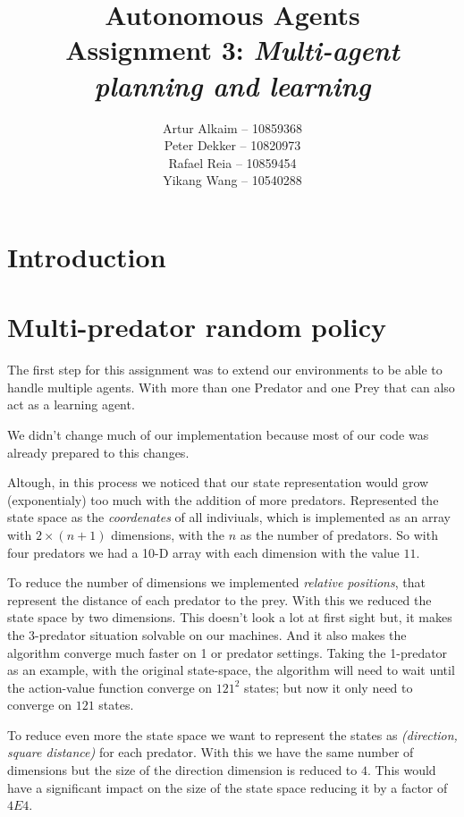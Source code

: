 \documentclass{article}
\begin{document}
\title{Autonomous Agents\\
Assignment 3: \emph{Multi-agent planning and learning}}
\author{
Artur Alkaim -- 10859368\\
Peter Dekker -- 10820973\\
Rafael Reia -- 10859454\\
Yikang Wang -- 10540288\\
}
\maketitle
\section{Introduction}

\section{Multi-predator random policy}
The first step for this assignment was to extend our environments to be able to
handle multiple agents. With more than one Predator and one Prey that can also
act as a learning agent.

We didn't change much of our implementation because most of our code was
already prepared to this changes.

Altough, in this process we noticed that our state representation would grow
(exponentialy) too much with the addition of more predators. Represented the
state space as the \emph{coordenates} of all indiviuals, which is implemented as
an array with $2 \times (n+1)$ dimensions, with the $n$ as the number of predators. So with four predators we had a 10-D array with each dimension with the value $11$. 

To reduce the number of dimensions we implemented \emph{relative positions},
that represent the distance of each predator to the prey. With this we reduced the
state space by two dimensions. This doesn't look a lot at first sight but, it makes the 3-predator situation solvable on our machines. And it also makes the algorithm converge much faster on 1 or predator settings. Taking the 1-predator as an example, with the original state-space, the algorithm will need to wait until the action-value function converge on $121^2$ states; but now it only need to converge on $121$ states.

To reduce even more the state space we want to represent the states as
\emph{(direction, square distance)} for each predator. With this we have the
same number of dimensions but the size of the direction dimension is reduced to $4$.
This would have a significant impact on the size of the state space reducing it
by a factor of $4E4$.
\end{document}
